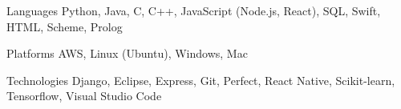 \begin{cvskills}

\cvskill
    {Languages}
    {Python, Java, C, C++, JavaScript (Node.js, React), SQL, Swift, HTML, Scheme, Prolog}

\cvskill
    {Platforms}
    {AWS, Linux (Ubuntu), Windows, Mac}

\cvskill
    {Technologies}
    {Django, Eclipse, Express, Git, Perfect, React Native, Scikit-learn, Tensorflow, Visual Studio Code}

\end{cvskills}
